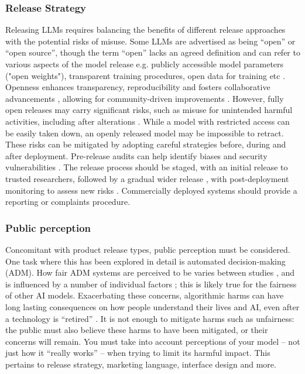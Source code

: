 \subsubsection{Release Strategy}
Releasing LLMs requires balancing the benefits of different release approaches with the potential risks of misuse. Some LLMs are advertised as being ``open'' or ``open source'', though the term ``open'' lacks an agreed definition and can refer to various aspects of the model release e.g. publicly accessible model parameters ("open weights"), transparent training procedures, open data for training etc \cite{solaiman_release_2019,widder_open_2023, groeneveld_olmo_2024}.
Openness enhances transparency, reproducibility and fosters collaborative advancements \cite{widder_open_2023,spirling_why_2023}, allowing for community-driven improvements \cite{madnani_building_2017}.
However, fully open releases may carry significant risks, such as misuse for unintended harmful activities, including after alterations \cite{arditi2024refusal}. While a model with restricted access can be easily taken down, an openly released model may be impossible to retract.
These risks can be mitigated by adopting careful strategies before, during and after deployment. Pre-release audits can help identify biases and security vulnerabilities \cite{madnani_building_2017,ji2023ai}. The release process should be staged, with an initial release to trusted researchers, followed by a gradual wider release \cite{solaiman_release_2019}, with post-deployment monitoring to assess new risks \cite{anderljung2023frontier}. Commercially deployed systems should provide a reporting or complaints procedure. 

\subsubsection{Public perception}
Concomitant with product release types, public perception must be considered. One task where this has been explored in detail is automated decision-making (ADM).
How fair ADM systems are perceived to be varies between studies \cite{lee_understanding_2018, araujo_ai_2020}, and is influenced by a number of individual factors \citep{wang_factors_2020}; this is likely true for the fairness of other AI models. Exacerbating these concerns, algorithmic harms can have long lasting consequences on how people understand their lives and AI, even after a technology is ``retired'' \citep{ehsan_algorithmic_2022}. It is not enough to mitigate harms such as unfairness: the public must also believe these harms to have been mitigated, or their concerns will remain. You must take into account perceptions of your model -- not just how it ``really works'' -- when trying to limit its harmful impact.  This pertains to release strategy, marketing language, interface design and more.

